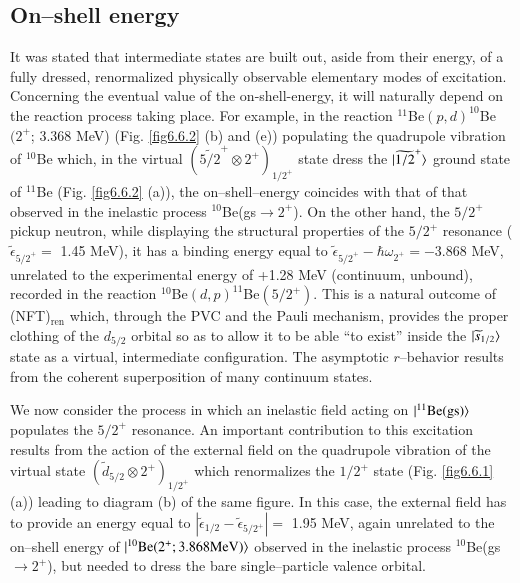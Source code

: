 \subsection{On--shell energy}
  It was stated that intermediate states are built out, aside from their energy, of a fully dressed, renormalized physically observable elementary modes of excitation. Concerning the eventual value of the on-shell-energy, it will naturally depend on the reaction process taking place.
For example, in the reaction $^{11}$Be$(p,d)^{10}$Be$(2^+$; 3.368 MeV) (Fig. \ref{fig6.6.2} (b) and (e)) populating the quadrupole vibration of $^{10}$Be which, in the virtual $(\widetilde{5/2}^+\otimes 2^+)_{1/2^+}$ state dress the $|{\widetilde{1/2}^+} \rangle$ ground state of $^{11}$Be (Fig. \ref{fig6.6.2} (a)), the on--shell--energy coincides with that of that observed in the inelastic process $^{10}$Be(gs$\to 2^+$). On the other hand, the $5/2^+$ pickup neutron, while displaying the structural properties of the $5/2^+$ resonance ($\tilde{\epsilon}_{{5/2}^+}=$ 1.45 MeV), it has a binding energy equal to $\tilde{\epsilon}_{{5/2}^+}-\hbar\omega_{2^+}=-3.868$ MeV, unrelated to the experimental energy of +1.28 MeV (continuum, unbound), recorded in the reaction $^{10}$Be$(d,p)^{11}$Be$(5/2^+)$. This is a natural outcome of (NFT)$_{\text{ren}}$ which, through the PVC and the Pauli mechanism, provides the proper clothing of the $d_{5/2}$ orbital so as to allow it to be able ``to exist'' inside the $|{\widetilde s_{1/2}} \rangle$ state as a virtual, intermediate configuration. The asymptotic $r$--behavior results from the coherent superposition of many continuum states.


 We now consider the process in which an inelastic field acting on $|{^{11}\text{Be(gs)}} \rangle$ populates the $5/2^+$ resonance. An important contribution to this excitation results from the action of the external field on the quadrupole vibration of the virtual state $(\tilde d_{5/2}\otimes 2^+)_{1/2^+}$ which renormalizes the $1/2^+$ state (Fig. \ref{fig6.6.1} (a)) leading to diagram (b) of the same figure. In this case, the external field has to provide an energy equal to $|\tilde \epsilon_{1/2}-\tilde \epsilon_{5/2^+}|=$ 1.95 MeV, again unrelated to the on--shell energy of $|{^{10}\text{Be}(2^+; 3.868\text{MeV})} \rangle$ observed in the inelastic process $^{10}$Be(gs$\to2^+$), but needed to dress the bare single--particle valence orbital.
